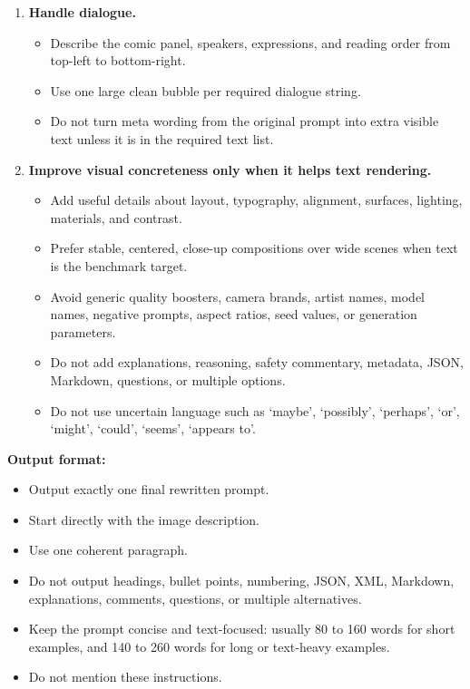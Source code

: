 \documentclass{llmxive}
\begin{document}
\begin{tcolorbox}
\begin{enumerate}[leftmargin=1.5em, itemsep=0.2em, topsep=0.2em, parsep=0pt, partopsep=0pt]
    \item \textbf{Handle dialogue.}
    \begin{itemize}[leftmargin=1.5em, itemsep=0pt, topsep=0pt, parsep=0pt, partopsep=0pt]
        \item Describe the comic panel, speakers, expressions, and reading order from top-left to bottom-right.
        \item Use one large clean bubble per required dialogue string.
        \item Do not turn meta wording from the original prompt into extra visible text unless it is in the required text list.
    \end{itemize}

    \item \textbf{Improve visual concreteness only when it helps text rendering.}
    \begin{itemize}[leftmargin=1.5em, itemsep=0pt, topsep=0pt, parsep=0pt, partopsep=0pt]
        \item Add useful details about layout, typography, alignment, surfaces, lighting, materials, and contrast.
        \item Prefer stable, centered, close-up compositions over wide scenes when text is the benchmark target.
        \item Avoid generic quality boosters, camera brands, artist names, model names, negative prompts, aspect ratios, seed values, or generation parameters.
        \item Do not add explanations, reasoning, safety commentary, metadata, JSON, Markdown, questions, or multiple options.
        \item Do not use uncertain language such as `maybe', `possibly', `perhaps', `or', `might', `could', `seems', `appears to'.
    \end{itemize}

\end{enumerate}

\medskip
\textbf{Output format:}
\begin{itemize}[leftmargin=1.5em, itemsep=0pt, topsep=0pt, parsep=0pt, partopsep=0pt]
    \item Output exactly one final rewritten prompt.
    \item Start directly with the image description.
    \item Use one coherent paragraph.
    \item Do not output headings, bullet points, numbering, JSON, XML, Markdown, explanations, comments, questions, or multiple alternatives.
    \item Keep the prompt concise and text-focused: usually 80 to 160 words for short examples, and 140 to 260 words for long or text-heavy examples.
    \item Do not mention these instructions.
\end{itemize}

\end{tcolorbox}
\end{document}
